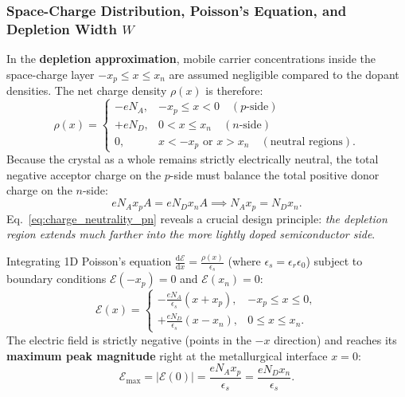 \documentclass[11pt,a4paper]{article}
\newcommand{\abs}[1]{\left|#1\right|}
\newcommand{\dv}[2]{\frac{\mathrm{d}#1}{\mathrm{d}#2}}
\begin{document}
\subsubsection{Space-Charge Distribution, Poisson's Equation, and Depletion Width \texorpdfstring{$W$}{W}}
In the \textbf{depletion approximation}, mobile carrier concentrations inside the space-charge layer $-x_p \le x \le x_n$ are assumed negligible compared to the dopant densities. The net charge density $\rho(x)$ is therefore:
\begin{equation}
    \rho(x) = \begin{cases}
        -e N_A, & -x_p \le x < 0 \quad (p\text{-side}) \\
        +e N_D, & 0 < x \le x_n \quad (n\text{-side}) \\
        0, & x < -x_p \text{ or } x > x_n \quad (\text{neutral regions}).
    \end{cases}
\end{equation}
Because the crystal as a whole remains strictly electrically neutral, the total negative acceptor charge on the $p$-side must balance the total positive donor charge on the $n$-side:
\begin{equation}
    e N_A x_p A = e N_D x_n A \implies \boxed{N_A x_p = N_D x_n.}
    \label{eq:charge_neutrality_pn}
\end{equation}
Eq.~\eqref{eq:charge_neutrality_pn} reveals a crucial design principle: \emph{the depletion region extends much farther into the more lightly doped semiconductor side}.

Integrating 1D Poisson's equation $\dv{\mathcal{E}}{x} = \frac{\rho(x)}{\epsilon_s}$ (where $\epsilon_s = \epsilon_r \epsilon_0$) subject to boundary conditions $\mathcal{E}(-x_p) = 0$ and $\mathcal{E}(x_n) = 0$:
\begin{equation}
    \mathcal{E}(x) = \begin{cases}
        -\frac{e N_A}{\epsilon_s}(x + x_p), & -x_p \le x \le 0, \\
        +\frac{e N_D}{\epsilon_s}(x - x_n), & 0 \le x \le x_n.
    \end{cases}
\end{equation}
The electric field is strictly negative (points in the $-x$ direction) and reaches its \textbf{maximum peak magnitude} right at the metallurgical interface $x = 0$:
\begin{equation}
    \boxed{\mathcal{E}_{\max} = \abs{\mathcal{E}(0)} = \frac{e N_A x_p}{\epsilon_s} = \frac{e N_D x_n}{\epsilon_s}.}
    \label{eq:emax_master}
\end{equation}
\end{document}
